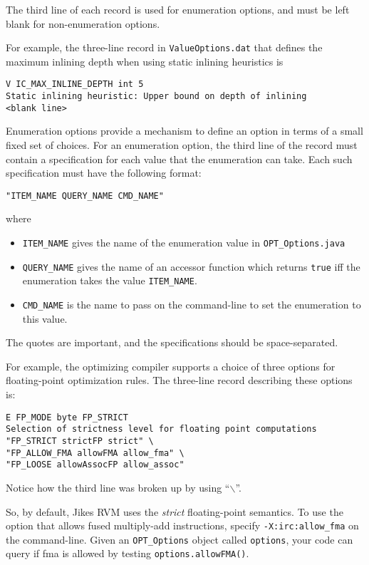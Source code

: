 The third line of each record is used for enumeration options, and must
be left blank for non-enumeration options.

For example, the three-line record in {\tt ValueOptions.dat}
that defines the maximum inlining depth when using static inlining
heuristics is
\begin{verbatim}
V IC_MAX_INLINE_DEPTH int 5
Static inlining heuristic: Upper bound on depth of inlining
<blank line>
\end{verbatim}

Enumeration options provide a mechanism to define an option in terms of 
a small fixed set of choices.  For an enumeration option, the third line
of the record must contain a specification for each value that the
enumeration can take.  Each such specification must have the following
format:
\begin{verbatim}
"ITEM_NAME QUERY_NAME CMD_NAME"
\end{verbatim}
where
\begin{itemize}
\item {\tt ITEM\_NAME} gives the name of the enumeration value in {\tt OPT\_Options.java}
\item {\tt QUERY\_NAME} gives the name of an accessor function which returns {\tt true} iff the enumeration takes the value {\tt ITEM\_NAME}.
\item {\tt CMD\_NAME} is the name to pass on the command-line to set the enumeration to this value.
\end{itemize}
The quotes are important, and the specifications should be
space-separated.

For example, the optimizing compiler supports a choice of three
options for floating-point optimization rules.  The three-line record
describing these options is:
\begin{verbatim}
E FP_MODE byte FP_STRICT
Selection of strictness level for floating point computations
"FP_STRICT strictFP strict" \
"FP_ALLOW_FMA allowFMA allow_fma" \
"FP_LOOSE allowAssocFP allow_assoc"
\end{verbatim}
Notice how the third line was broken up by using ``$\backslash$''.

So, by default, Jikes RVM uses the {\em strict} floating-point
semantics.  To use the option that allows fused multiply-add
instructions, specify {\tt -X:irc:allow\_fma} on the command-line.
Given an {\tt OPT\_Options} object called {\tt options}, your code can
query if fma is allowed by testing {\tt options.allowFMA()}.

